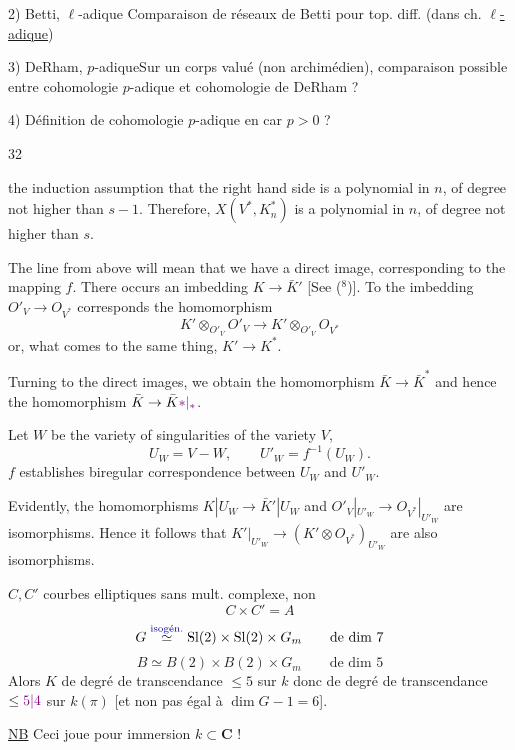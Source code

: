 2) Betti, $\ell$-adique\qquad {} Comparaison de réseaux de Betti pour top. diff.
(dans ch. \uline{$\ell$-adique})

3) DeRham, $p$-adique\qquad Sur un corps valué  (non archimédien), \inserted{corps résiduel car $p$]} comparaison possible entre cohomologie $p$-adique et cohomologie de DeRham ?

4) Définition de cohomologie $p$-adique en car $p>0$ ?

\begin{flushright}32\end{flushright}

the induction assumption that the right hand side is a polynomial in $n$, of degree not higher than $s-1$. Therefore, $X(V^*,K_n^*)$ is a polynomial in $n$, of degree not higher than $s$.

The line from above will mean that we have a direct image, corresponding to the mapping $f$. There occurs an imbedding $K\to\bar K'$ [See (${}^8$)]. To the imbedding $O'_V\to O_{V^*}$ corresponds the homomorphism
\[
 K'\otimes_{O'_V}O'_V\longrightarrow K'\otimes_{O'_V}O_{V^*}
\]
or, what comes to the same thing, $K'\to K^*$.

Turning to the direct images, we obtain the homomorphism $\bar K\to\bar K^*$ and hence the homomorphism $\bar K\to\bar K\unsure{*|{}_*}$.

Let $W$ be the variety of singularities of the variety $V$,
\[
 U_W=V-W,\qquad U'_W=f^{-1}(U_W).
\]
$f$ establishes biregular correspondence between $U_W$ and $U'_W$.

Evidently, the homomorphisms $K|U_W\to\bar K'|U_W$ and $O'_V|_{U'_W}\to O_{V^*}|_{U'_W}$ are isomorphisms. Hence it follows that $K'|_{U'_W}\to(K'\otimes O_{V^*})_{U'_W}$ are also isomorphisms.

$C,C'$ courbes elliptiques sans mult. complexe, non  \unsure{$\circ$} 
\[
 C\times C'=A
\]
\[
 G\overset{\inserted{\text{isogén.}}}{\simeq}\mathrm{Sl}(2)\times\mathrm{Sl}(2)\times G_m\qquad\text{de dim }7
\]
\[
 B\simeq B(2)\times B(2)\times G_m\qquad\text{de dim }5
\]
Alors $K$ de degré de transcendance $\leq5$ sur $k$ donc de degré de transcendance $\leq\unsure{5|4}$ sur $k(\pi)$ [et non pas égal à $\dim G-1=6$].

\uline{NB} Ceci joue pour \uline{} immersion $k\subset\mathbf C$ !

